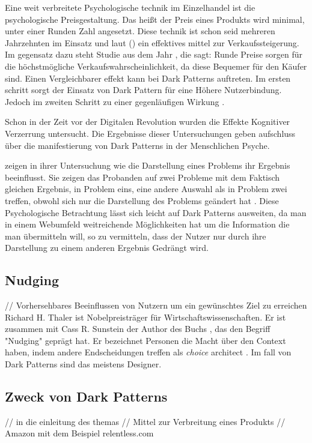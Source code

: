\documentclass[conference,compsoc,final,a4paper]{IEEEtran}
\begin{document}
Eine weit verbreitete Psychologische technik im Einzelhandel ist die psychologische Preisgestaltung. Das heißt der Preis eines Produkts wird minimal, unter einer Runden Zahl angesetzt. Diese technik ist schon seid mehreren Jahrzehnten im Einsatz und laut \citeauthor{Bizer_2005} () \autocite{Bizer_2005} ein effektives mittel zur Verkaufssteigerung. Im gegensatz dazu steht \citeauthor{Wieseke_2015} \autocite{Wieseke_2015}Studie aus dem Jahr , die sagt: Runde Preise sorgen für die höchstmögliche Verkaufswahrscheinlichkeit, da diese Bequemer für den Käufer sind. Einen Vergleichbarer effekt kann bei Dark Patterns auftreten. Im ersten schritt sorgt der Einsatz von Dark Pattern für eine Höhere Nutzerbindung. Jedoch im zweiten Schritt zu einer gegenläufigen Wirkung \autocite{M.Bhoot2020}.

Schon in der Zeit vor der Digitalen Revolution wurden die Effekte Kognitiver Verzerrung untersucht. Die Ergebnisse dieser Untersuchungen geben aufschluss über die manifestierung von Dark Patterns in der Menschlichen Psyche.

\citeauthor{Tversky453} zeigen in ihrer Untersuchung wie die Darstellung eines Problems ihr Ergebnis beeinflusst. Sie zeigen das Probanden auf zwei Probleme mit dem Faktisch gleichen Ergebnis, in Problem eins, eine andere Auswahl als in Problem zwei treffen, obwohl sich nur die Darstellung des Problems geändert hat \autocite{Tversky453}. Diese Psychologische Betrachtung lässt sich leicht auf Dark Patterns ausweiten, da man in einem Webumfeld weitreichende Möglichkeiten hat um die Information die man übermitteln will, so zu vermitteln, dass der Nutzer nur durch ihre Darstellung zu einem anderen Ergebnis Gedrängt wird.
\subsection{Nudging}
// Vorhersehbares Beeinflussen von Nutzern um ein gewünschtes Ziel zu erreichen\\
Richard H. Thaler ist Nobelpreisträger für Wirtschaftswissenschaften. Er ist zusammen mit Cass R. Sunstein der Author des Buchs , das den Begriff "Nudging" geprägt hat. Er bezeichnet Personen die Macht über den Context haben, indem andere Endscheidungen treffen als \textit{choice} architect \autocite[S. 3]{Thaler2008}. Im fall von Dark Patterns sind das meistens Designer. 
\subsection{Zweck von Dark Patterns}
// in die einleitung des themas
// Mittel zur Verbreitung eines Produkts
// Amazon mit dem Beispiel relentless.com
\end{document}
